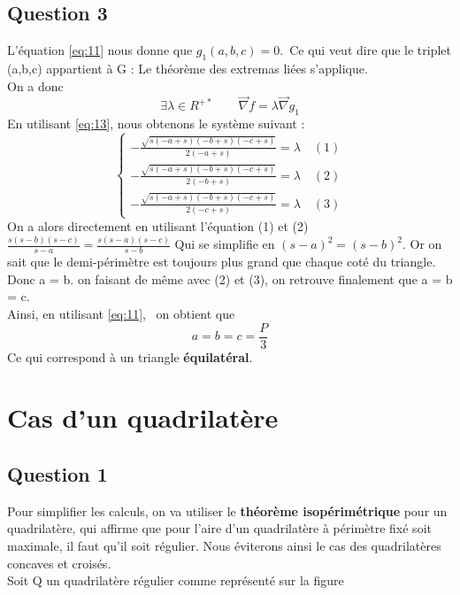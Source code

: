 \documentclass[12pt]{report}
\begin{document}
\section{Question 3}
\indent L'équation \eqref{eq:11} nous donne que $g_{1}(a,b,c) = 0$.\ Ce qui veut dire que le triplet (a,b,c) appartient à G : Le théorème des extremas liées s'applique.\\
On a donc 
\begin{equation}\label{eq:13}
   \exists\lambda\in R^{+*} \quad \quad \overrightarrow{\nabla}f = \lambda \overrightarrow{\nabla}g_{1}
\end{equation}
En utilisant \eqref{eq:13}, nous obtenons le système suivant :
\begin{equation}
\begin{cases} - \frac{\sqrt{s \left(- a + s\right) \left(- b + s\right) \left(- c + s\right)}}{2 \left(- a + s\right)} = \lambda \quad (1)\\
- \frac{\sqrt{s \left(- a + s\right) \left(- b + s\right) \left(- c + s\right)}}{2 \left(- b + s\right)} = \lambda \quad (2) \\
- \frac{\sqrt{s \left(- a + s\right) \left(- b + s\right) \left(- c + s\right)}}{2 \left(- c + s\right)} = \lambda 
\quad (3) \end{cases}
\end{equation}
On a alors directement en utilisant l'équation (1) et (2) $\frac{s(s-b)(s-c)}{s-a} = \frac{s(s-a)(s-c)}{s-b}$
Qui se simplifie en $(s-a)^{2}=(s-b)^{2}$.
Or on sait que le demi-périmètre est toujours plus grand que chaque coté du triangle. Donc a = b.
on faisant de même avec (2) et (3), on retrouve finalement que a = b = c.\\
Ainsi, en utilisant \eqref{eq:11}, \ on obtient que 
\begin{equation}
   \boxed{a = b = c = \frac{P}{3}}
\end{equation}
Ce qui correspond à un triangle \textbf{équilatéral}.
\chapter{Cas d'un quadrilatère}
\section{Question 1}
\indent Pour simplifier les calculs, on va utiliser le \textbf{théorème isopérimétrique} pour un quadrilatère, qui affirme que 
pour l'aire d'un quadrilatère à périmètre fixé soit maximale, il faut qu'il soit régulier. Nous éviterons ainsi le cas des quadrilatères concaves et croisés.\\
Soit Q un quadrilatère régulier comme représenté sur la figure 
\end{document}
